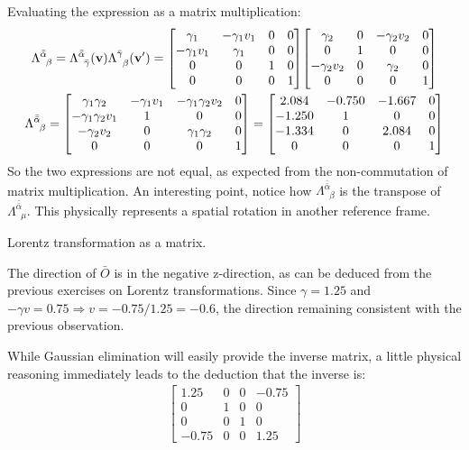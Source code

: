 \documentclass{report}
\begin{document}
\begin{subquests}
\begin{subquests}
		\item		
		Evaluating the expression as a matrix multiplication:
		\begin{gather*}
			\Lambda^{\bar{\bar{\alpha}}}_{\;\;\beta} = \Lambda^{\bar{\bar{\alpha}}}_{\;\;\bar{\gamma}}({\vb v})\Lambda^{\bar{\gamma}}_{\;\;\beta}({\vb v'}) =
			\mqty[
				\gamma_{1} & -\gamma_{1} v_{1} & 0 & 0 \\
				-\gamma_{1} v_{1} & \gamma_{1} & 0 & 0 \\
				0 & 0 & 1 & 0 \\
				0 & 0 & 0 & 1
			]
			\mqty[
				\gamma_{2} & 0 & -\gamma_{2} v_{2} & 0 \\
				 0 & 1 & 0 & 0 \\
				-\gamma_{2} v_{2} & 0 & \gamma_{2} & 0 \\
				0 & 0 & 0 & 1
			] \\
			\Lambda^{\bar{\bar{\alpha}}}_{\;\;\beta} = 	
			\mqty[
				\gamma_{1}\gamma_{2} & -\gamma_{1}v_{1} & -\gamma_{1}\gamma_{2} v_{2} & 0 \\
				-\gamma_{1}\gamma_{2}v_{1} & 1 & 0 & 0 \\
				-\gamma_{2}v_{2} & 0 & \gamma_{1}\gamma_{2} & 0 \\
				0 & 0 & 0 & 1
			]
			=
			\mqty[
				2.084 & -0.750 & -1.667 & 0 \\
				-1.250 & 1 & 0 & 0 \\
				-1.334 & 0 & 2.084 & 0 \\
				0 & 0 & 0 & 1
			]
		\end{gather*}
		So the two expressions are not equal, as expected from the non-commutation of matrix multiplication. An interesting point, notice how $\Lambda^{\bar{\bar{\alpha}}}_{\;\;\beta}$ is the transpose of $\Lambda^{\bar{\bar{\alpha}}}_{\;\;\mu}.$ This physically represents a spatial rotation in another reference frame.
	\end{subquests}

	\item{Lorentz transformation as a matrix.}
	\begin{subquests}
		\item
		The direction of $\bar{O}$ is in the negative z-direction, as can be deduced from the previous exercises on Lorentz transformations. Since $\gamma = 1.25$ and $-\gamma v = 0.75 \Rightarrow v = -0.75/1.25 = -0.6$, the direction remaining consistent with the previous observation.

		\item
		While Gaussian elimination will easily provide the inverse matrix, a little physical reasoning immediately leads to the deduction that the inverse is:
		\begin{gather*}
			\begin{bmatrix}
				1.25 & 0 & 0 & -0.75 \\
				0 & 1 & 0 & 0 \\
				0 & 0 & 1 & 0 \\
				-0.75 & 0 & 0 & 1.25
			\end{bmatrix}
		\end{gather*}
		

\end{subquests}
\end{subquests}
\end{document}
